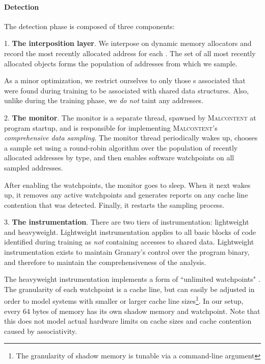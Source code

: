 \documentclass[letterpaper,twocolumn,10pt]{article}
\newcommand{\TextToolname}{Malcontent}
\newcommand{\Toolname}{\textsc{\TextToolname{}}}
\begin{document}
\paragraph{Detection}

The detection phase is composed of three components: 

1. {\bf The interposition layer}. We interpose on dynamic memory allocators and record the most recently allocated
address for each \TypeId{}. The set of all most recently allocated objects forms the population of addresses from which
we sample.

As a minor optimization, we restrict ourselves to only those {\TypeId}s associated that were found during training
to be associated with shared data structures. Also, unlike during the training phase, we \emph{do not} taint any
addresses.

2.  {\bf The monitor}. The monitor is a separate thread, spawned by \Toolname{} at program startup, and is responsible
for implementing \Toolname's \emph{comprehensive data sampling}. The monitor thread periodically
wakes up, chooses a sample set using a round-robin algorithm over the population of recently allocated addresses by type, and
then enables software watchpoints on all sampled addresses.

After enabling the watchpoints, the monitor goes to sleep. When it next wakes up, it removes any active watchpoints
and generates reports on any cache line contention that was detected. Finally, it restarts the sampling process.

3. {\bf The instrumentation}. There are two tiers of instrumentation: lightweight and heavyweight. Lightweight
instrumentation applies to all basic blocks of code identified during training as \emph{not} containing accesses to shared
data. Lightweight instrumentation exists to maintain Granary's control over the program binary, and therefore to maintain
the comprehensiveness of the analysis.

The heavyweight instrumentation implements a form of ``unlimited watchpoints" \cite{UnlimitedWatchpoints}. The
granularity of each watchpoint is a cache line, but can easily be adjusted in order to model systems with smaller or
larger cache line sizes\footnote{The granularity of shadow memory is tunable via a command-line argument}.
In our setup, every 64 bytes of memory has its own shadow memory and watchpoint. Note that
this does not model actual hardware limits on cache sizes and cache contention caused by associativity.
\end{document}
